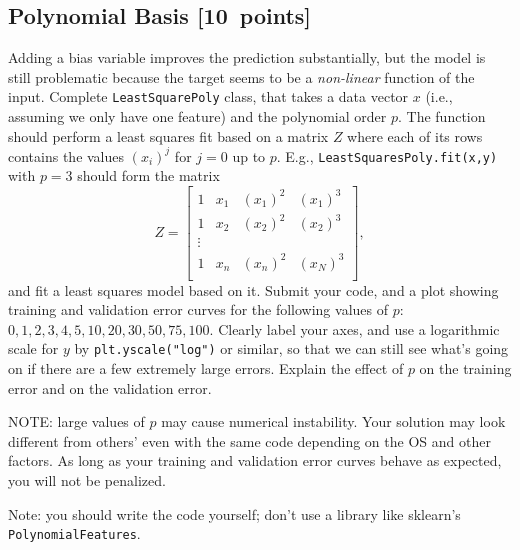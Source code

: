 \documentclass{article}
\newcommand{\blu}[1]{{\textcolor{blu}{#1}}}
\let\ask\blu
\newcommand\pts[1]{\textcolor{pointscolour}{[#1~points]}}
\begin{document}
\subsection{Polynomial Basis \pts{10}}

Adding a bias variable improves the prediction substantially, but the model is still problematic because the target seems to be a \emph{non-linear} function of the input.
Complete \texttt{LeastSquarePoly} class, that takes a data vector $x$ (i.e., assuming we only have one feature) and the polynomial order $p$. The function should perform a least squares fit based on a matrix $Z$ where each of its rows contains the values $(x_{i})^j$ for $j=0$ up to $p$. E.g., \texttt{LeastSquaresPoly.fit(x,y)}  with $p = 3$ should form the matrix
\[
Z =
\left[\begin{array}{cccc}
1 & x_1 & (x_1)^2 & (x_1)^3\\
1 & x_2 & (x_2)^2 & (x_2)^3\\
\vdots\\
1 & x_n & (x_n)^2 & (x_N)^3\\
\end{array}
\right],
\]
and fit a least squares model based on it.
\ask{Submit your code, and a plot showing training and validation error curves for the following values of $p$: $0,1,2,3,4,5,10,20,30,50,75,100$. Clearly label your axes, and use a logarithmic scale for $y$} by \texttt{plt.yscale("log")} or similar, so that we can still see what's going on if there are a few extremely large errors. \ask{Explain the effect of $p$ on the training error and on the validation error.}

NOTE: large values of $p$ may cause numerical instability. Your solution may look different from others' even with the same code depending on the OS and other factors. As long as your training and validation error curves behave as expected, you will not be penalized.

Note: you should write the code yourself; don't use a library like sklearn's \texttt{PolynomialFeatures}.
\end{document}
